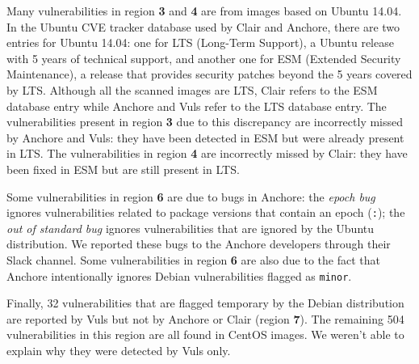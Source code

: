 \documentclass[a4paper,num-refs]{oup-contemporary}
\begin{document}
Many vulnerabilities in region \textbf{3} and \textbf{4} are from images
based on Ubuntu 14.04. In the Ubuntu CVE tracker database used by Clair and
Anchore, there are two entries for Ubuntu 14.04: one for LTS (Long-Term
Support), a Ubuntu release with 5 years of technical support, and another one
for ESM (Extended Security Maintenance), a release that provides security
patches beyond the 5 years covered by LTS. Although all the scanned images
are LTS, Clair refers to the ESM database entry while Anchore and Vuls refer to the
LTS database entry. The vulnerabilities present in region \textbf{3} due to
this discrepancy are incorrectly missed by Anchore and Vuls: they have been
detected in ESM but were already present in LTS. The vulnerabilities in
region \textbf{4} are incorrectly missed by Clair: they have been fixed in
ESM but are still present in LTS. 

Some vulnerabilities in region \textbf{6} are due to bugs in Anchore: the
\textit{epoch bug} ignores vulnerabilities related to package versions that
contain an epoch (\texttt{:}); the \textit{out of standard bug} ignores
vulnerabilities that are ignored by the Ubuntu distribution. We reported
these bugs to the Anchore developers through their Slack channel. Some
vulnerabilities in region \textbf{6} are also due to the fact that Anchore
intentionally ignores Debian vulnerabilities flagged as \texttt{minor}.

Finally, 32 vulnerabilities that are flagged temporary by the Debian
distribution are reported by Vuls but not by Anchore or Clair (region
\textbf{7}). The remaining 504 vulnerabilities in this region are all found
in CentOS images. We weren't able to explain why they were detected by Vuls
only.
\end{document}

